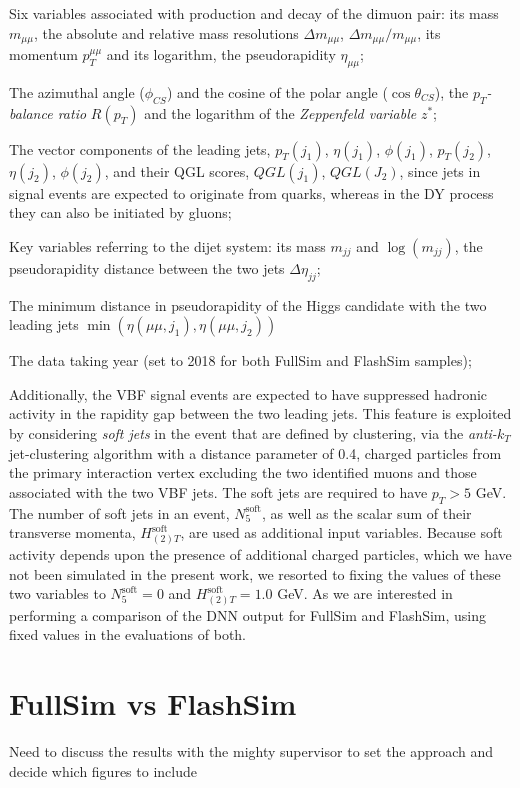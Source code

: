 \begin{outline}
\1 Six variables associated with production and decay of the dimuon pair: its mass $m_{\mu\mu}$, the absolute and relative mass resolutions $\Delta m_{\mu\mu}$, $\Delta m_{\mu\mu}/m_{\mu\mu}$, its momentum $p_T^{\mu\mu}$ and its logarithm, the pseudorapidity $\eta_{\mu\mu}$;

\1 The azimuthal angle ($\phi_{CS}$) and the cosine of the polar angle ($\cos\theta_{CS}$), the $p_T$\emph{-balance ratio} $R(p_T)$ and the logarithm of the \emph{Zeppenfeld variable} $z^*$;

\1 The vector components of the leading jets, $p_T(j_1)$, $\eta(j_1)$, $\phi(j_1)$, $p_T(j_2)$, $\eta(j_2)$, $\phi(j_2)$, and their QGL scores, $QGL(j_1)$, $QGL(J_2)$, since jets in signal events are expected to originate from quarks, whereas in the DY process they can also be initiated by gluons;

\1 Key variables referring to the dijet system: its mass $m_{jj}$ and $\log(m_{jj})$, the pseudorapidity distance between the two jets $\Delta \eta_{jj}$;

\1  The minimum distance in pseudorapidity of the Higgs candidate with the two leading jets $\min(\eta(\mu\mu, j_1),\eta(\mu\mu, j_2))$

\1 The data taking year (set to 2018 for both FullSim and FlashSim samples);
\end{outline}

Additionally, the VBF signal events are expected to have suppressed hadronic activity in the rapidity gap between the two leading jets. This feature is exploited by considering \emph{soft jets} in the event that are defined by clustering, via the \emph{anti-}$k_T$ jet-clustering algorithm with a distance parameter of 0.4, charged particles from the primary interaction vertex excluding the two identified muons and those associated with the two VBF jets. The soft jets are required to have $p_T>5$ GeV. The number of soft jets in an event, $N^{\text{soft}}_5$, as well as the scalar sum of their transverse momenta, $H^{\text{soft}}_{(2)T}$, are used as additional input variables. 
Because soft activity depends upon the presence of additional charged particles, which we have not been simulated in the present work, we resorted to fixing the values of these two variables to $N^{\text{soft}}_5=0$ and $H^{\text{soft}}_{(2)T}=1.0$ GeV. As we are interested in performing a comparison of the DNN output for FullSim and FlashSim, using fixed values in the evaluations of both.

\section{FullSim vs FlashSim}

Need to discuss the results with the mighty supervisor to set the approach and decide which figures to include